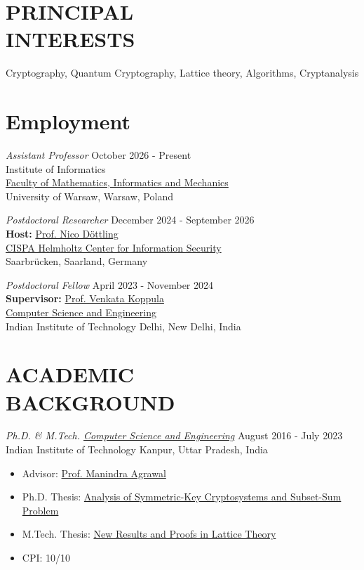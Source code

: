 \documentclass[margin]{res} %
\begin{document}
\begin{resume}

 
\section{PRINCIPAL \\ INTERESTS}  

Cryptography, Quantum Cryptography, Lattice theory, Algorithms, Cryptanalysis


\section{Employment}

{\sl Assistant Professor} \hfill October 2026 - Present \\
Institute of Informatics\\
\href{https://www.mimuw.edu.pl/en/}{Faculty of Mathematics, Informatics and Mechanics}\\
University of Warsaw, Warsaw, Poland

{\sl Postdoctoral Researcher} \hfill December 2024 - September 2026 \\
\textbf{Host:} \href{https://sites.google.com/site/nicodoettling/}{Prof. Nico Döttling} \\
\href{https://cispa.de/en}{CISPA Helmholtz Center for Information Security}\\
Saarbrücken, Saarland, Germany


{\sl Postdoctoral Fellow} \hfill April 2023 - November 2024 \\
\textbf{Supervisor:} \href{https://web.iitd.ac.in/~kvenkata/}{Prof. Venkata Koppula}\\
\href{https://homecse.iitd.ac.in}{Computer Science and Engineering}\\
Indian Institute of Technology Delhi, New Delhi, India


 
\section{ACADEMIC \\BACKGROUND}

{\sl Ph.D. \& M.Tech. \href{https://www.cse.iitk.ac.in}{Computer Science and Engineering}} \hfill August 2016 - July 2023 \\
Indian Institute of Technology Kanpur, Uttar Pradesh, India
\begin{itemize}
\item Advisor: \href{https://en.wikipedia.org/wiki/Manindra_Agrawal}{Prof. Manindra Agrawal}
\item Ph.D. Thesis: \href{https://mahe94.github.io/assets/bibliography/phd_thesis.pdf}{Analysis of Symmetric-Key Cryptosystems and Subset-Sum Problem}
\item M.Tech. Thesis: \href{https://mahe94.github.io/assets/bibliography/mtech_thesis.pdf}{New Results and Proofs in Lattice Theory}
\item CPI: 10/10
\end{itemize} 


\end{resume}
\end{document}
